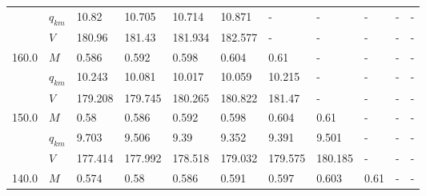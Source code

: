 \begin{tabular}{|l|l|lllllllll|}
      & $q_{km}$ &                     10.82 &   10.705\cellcolor{green} &                    10.714 &                    10.871 &                         - &                         - &                         - &                         - &                         - \\
      & $V$ &                    180.96 &   181.43\cellcolor{green} &                   181.934 &                   182.577 &                         - &                         - &                         - &                         - &                         - \\
\hline
160.0 & $M$ &                     0.586 &                     0.592 &    0.598\cellcolor{green} &                     0.604 &                      0.61 &                         - &                         - &                         - &                         - \\
      & $q_{km}$ &                    10.243 &                    10.081 &   10.017\cellcolor{green} &                    10.059 &                    10.215 &                         - &                         - &                         - &                         - \\
      & $V$ &                   179.208 &                   179.745 &  180.265\cellcolor{green} &                   180.822 &                    181.47 &                         - &                         - &                         - &                         - \\
\hline
150.0 & $M$ &                      0.58 &                     0.586 &                     0.592 &    0.598\cellcolor{green} &                     0.604 &                      0.61 &                         - &                         - &                         - \\
      & $q_{km}$ &                     9.703 &                     9.506 &                      9.39 &    9.352\cellcolor{green} &                     9.391 &                     9.501 &                         - &                         - &                         - \\
      & $V$ &                   177.414 &                   177.992 &                   178.518 &  179.032\cellcolor{green} &                   179.575 &                   180.185 &                         - &                         - &                         - \\
\hline
140.0 & $M$ &                     0.574 &                      0.58 &                     0.586 &                     0.591 &    0.597\cellcolor{green} &                     0.603 &                      0.61 &                         - &                         - \\

\end{tabular}
